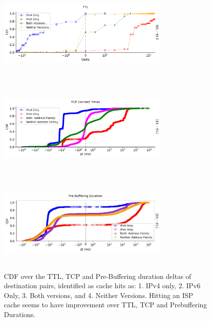 \begin{figure}[!ht]
	\centering
	\begin{minipage}{0.5\textwidth}
		\centering
		\includegraphics[keepaspectratio, height=5cm, width=8.5cm]{figures/traceroute/netflix-traceroute-median-ttl-cache-pair-cdf.pdf}
	\end{minipage}
	\begin{minipage}{0.5\textwidth}
		\centering
		\includegraphics[keepaspectratio, height=5cm, width=8.5cm]{figures/traceroute/netflix-traceroute-median-tcp-cache-pair-cdf.pdf}
	\end{minipage}
	\begin{minipage}{0.5\textwidth}
		\centering
		\includegraphics[keepaspectratio, height=5cm, width=8.5cm]{figures/traceroute/netflix-traceroute-median-pd-cache-pair-cdf.pdf}
	\end{minipage}
	\caption[TTL, TCP and Pre-buffering Duration Cache Pair CDF]{CDF over the TTL, TCP and Pre-Buffering duration deltas of destination pairs, identified as cache hits as: 1. IPv4 only, 2. IPv6 Only, 3. Both versions, and 4. Neither Versions. Hitting an ISP cache seems to have improvement over TTL, TCP and Prebuffering Durations.}
	\label{fig:TTL, TCP, and Pre-Buffering Duration Cache Pair CDF}
\end{figure}

